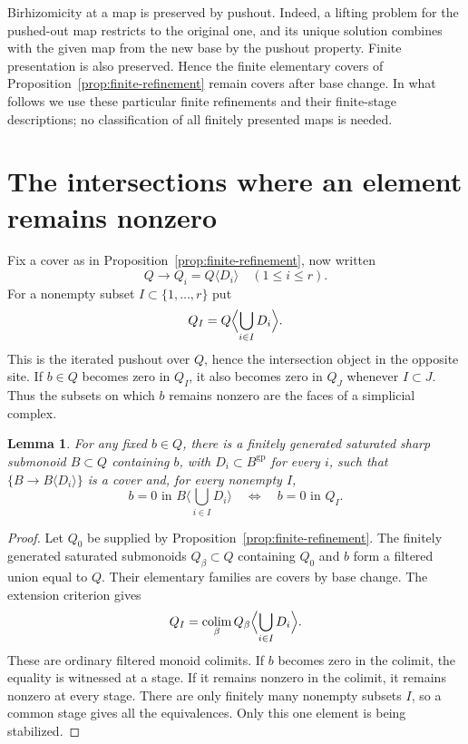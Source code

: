 \documentclass[11pt]{article}
\newtheorem{lemma}[theorem]{Lemma}
\theoremstyle{definition}
\theoremstyle{remark}
\newcommand{\gp}{\mathrm{gp}}
\newcommand{\colim}{\operatorname*{colim}}
\begin{document}
Birhizomicity at a map is preserved by pushout. Indeed, a lifting problem for the pushed-out map restricts to the original one, and its unique solution combines with the given map from the new base by the pushout property. Finite presentation is also preserved. Hence the finite elementary covers of Proposition~\ref{prop:finite-refinement} remain covers after base change. In what follows we use these particular finite refinements and their finite-stage descriptions; no classification of all finitely presented maps is needed.

\section{The intersections where an element remains nonzero}

Fix a cover as in Proposition~\ref{prop:finite-refinement}, now written
\[
 Q\longrightarrow Q_i=Q\langle D_i\rangle\quad(1\leq i\leq r).
\]
For a nonempty subset $I\subset\{1,\ldots,r\}$ put
\[
 Q_I=Q\Bigl\langle\bigcup_{i\in I}D_i\Bigr\rangle.
\]
This is the iterated pushout over $Q$, hence the intersection object in the opposite site. If $b\in Q$ becomes zero in $Q_I$, it also becomes zero in $Q_J$ whenever $I\subset J$. Thus the subsets on which $b$ remains nonzero are the faces of a simplicial complex.

\begin{lemma}\label{lem:stabilization}
For any fixed $b\in Q$, there is a finitely generated saturated sharp submonoid $B\subset Q$ containing $b$, with $D_i\subset B^{\gp}$ for every $i$, 
such that $\{B\to B\langle D_i\rangle\}$ is a cover and, for every nonempty $I$,
\[
 b=0\text{ in }B\langle\textstyle\bigcup_{i\in I}D_i\rangle
 \quad\Longleftrightarrow\quad b=0\text{ in }Q_I.
\]
\end{lemma}

\begin{proof}
Let $Q_0$ be supplied by Proposition~\ref{prop:finite-refinement}. The finitely generated saturated submonoids $Q_\beta\subset Q$ containing $Q_0$ and $b$ form a filtered union equal to $Q$. Their elementary families are covers by base change. The extension criterion gives
\[
 Q_I=\colim_\beta Q_\beta\Bigl\langle\bigcup_{i\in I}D_i\Bigr\rangle.
\]
These are ordinary filtered monoid colimits. If $b$ becomes zero in the colimit, the equality is witnessed at a stage. If it remains nonzero in the colimit, it remains nonzero at every stage. There are only finitely many nonempty subsets $I$, so a common stage gives all the equivalences. Only this one element is being stabilized.
\end{proof}
\end{document}
